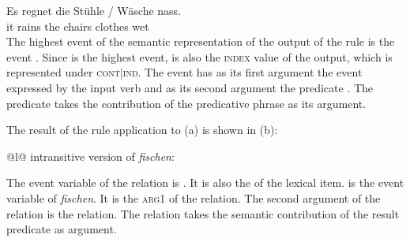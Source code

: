 \ea
\gll Es regnet die Stühle / Wäsche nass.\\
     it rains  the chairs {} clothes wet\\
\z
The highest event of the semantic representation of the output of the rule is the  event
. Since  is the highest event,  is also the \textsc{index} value of
the output, which is represented under \textsc{cont|ind}. The  event has as its first
argument the event expressed by the input verb  and as its second argument the
 predicate . The  predicate takes the contribution of the
predicative phrase  as its argument. 

The result of the rule application to (a) is shown in (b):
\eal
\ex
\begin{tabular}[t]{@{}l@{}}
intransitive version of \emph{fischen}:\\
\end{tabular}

\ex 
{}
\zl
The event variable of the  relation is . It is also the \indv of the lexical item.
 is the event variable of \emph{fischen}. It is the \textsc{arg1} of the 
relation. The second argument of the  relation is the  relation. The
 relation takes the semantic contribution of the result predicate  as argument.

